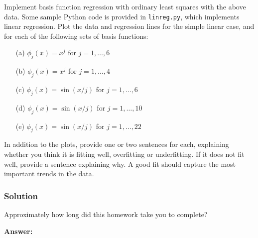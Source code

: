 \documentclass[submit]{harvardml}
\begin{document}
\begin{problem}
Implement basis function regression with ordinary least squares with the above
data. Some sample Python code is provided in \verb|linreg.py|, which implements
linear regression.  Plot the data and regression lines for the simple linear
case, and for each of the following sets of basis functions:
\begin{itemize}
	\item[(a)] $\phi_j(x) = x^j$ for $j=1, \ldots, 6$
	\item[(b)] $\phi_j(x) = x^j$ for $j=1, \ldots, 4$
	\item[(c)] $\phi_j(x) = \sin(x / j)$ for $j=1, \ldots, 6$
	\item[(d)] $\phi_j(x) = \sin(x / j)$ for $j=1, \ldots, 10$
	\item[(e)] $\phi_j(x) = \sin(x / j)$ for $j=1, \ldots, 22$
\end{itemize}
  In addition to the plots, provide one or two sentences for each, explaining
  whether you think it is fitting well, overfitting or underfitting.  If it does
  not fit well, provide a sentence explaining why. A good fit should capture the
  most important trends in the data.
	\end{problem}

\subsubsection*{Solution}











\newpage
\begin{problem}[Calibration, 1pt]
Approximately how long did this homework take you to complete?
\end{problem}
\textbf{Answer:}
\end{document}
